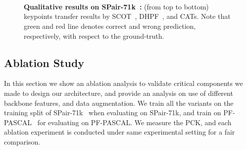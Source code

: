 \begin{figure}[!t]
    \centering
    \renewcommand{\thesubfigure}{}
    \hfill
    \hfill
    \hfill
    \hfill\\
	\vspace{-20.5pt}
	\hfill
    \hfill
    \hfill
    \hfill\\
	\vspace{-20.5pt}
    \hfill
    \hfill
    \hfill
    \hfill\\
	\vspace{-10pt}
    \caption{\textbf{Qualitative results on SPair-71k~\cite{min2019spair}:} (from top to bottom) keypoints transfer results by SCOT~\cite{liu2020semantic}, DHPF~\cite{min2020learning}, and CATs. Note that green and red line denotes correct and wrong prediction, respectively, with respect to the ground-truth.}\label{fig:spair_quali}\vspace{-10pt}
  
\end{figure}

\subsection{Ablation Study}\label{sec:4.4}
In this section we show an ablation analysis to validate critical components we made to design our architecture, and provide an analysis on use of different backbone features, and data augmentation. We train all the variants on the training split of SPair-71k~\cite{min2019spair} when evaluating on SPair-71k, and train on PF-PASCAL~\cite{ham2017proposal} for evaluating on PF-PASCAL. We measure the PCK, and each ablation experiment is conducted under same experimental setting for a fair comparison. \vspace{-5pt}

